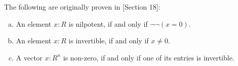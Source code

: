 The following are originally proven in 
\cite{ingo-thesis}[Section 18]:

\begin{proposition}%
  \label{nilpotence-double-negation}\label{non-zero-invertible}\label{generalized-field-property}
  
  \begin{enumerate}[(a)]
  \item An element $x:R$ is nilpotent,
    if and only if $\neg \neg (x=0)$.
  \item An element $x:R$ is invertible,
    if and only if $x\neq 0$.
  \item A vector $x:R^n$ is non-zero,
    if and only if one of its entries is invertible.
  \end{enumerate}
\end{proposition}
